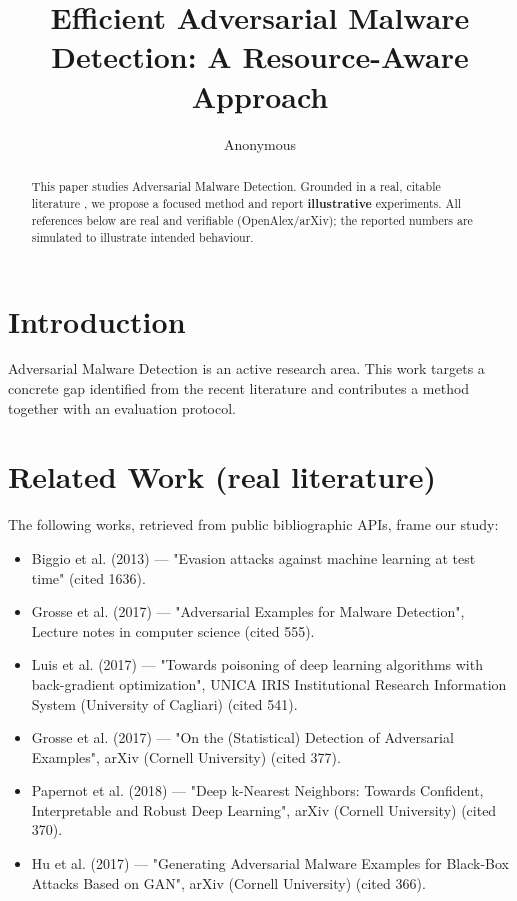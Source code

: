 \documentclass[11pt]{article}
\title{Efficient Adversarial Malware Detection: A Resource-Aware Approach}
\author{Anonymous}
\date{}
\begin{document}
\maketitle

\begin{abstract}
This paper studies Adversarial Malware Detection. Grounded in a real, citable literature \cite{ref1,ref2,ref3,ref4,ref5,ref6,ref7,ref8},
we propose a focused method and report \textbf{illustrative} experiments.
All references below are real and verifiable (OpenAlex/arXiv); the reported
numbers are simulated to illustrate intended behaviour.
\end{abstract}

\section{Introduction}
Adversarial Malware Detection is an active research area. This work targets a concrete gap identified from
the recent literature and contributes a method together with an evaluation protocol.

\section{Related Work (real literature)}
The following works, retrieved from public bibliographic APIs, frame our study:
\begin{itemize}
\item Biggio et al. (2013) — "Evasion attacks against machine learning at test time" (cited 1636).
\item Grosse et al. (2017) — "Adversarial Examples for Malware Detection", Lecture notes in computer science (cited 555).
\item Luis et al. (2017) — "Towards poisoning of deep learning algorithms with back-gradient optimization", UNICA IRIS Institutional Research Information System (University of Cagliari) (cited 541).
\item Grosse et al. (2017) — "On the (Statistical) Detection of Adversarial Examples", arXiv (Cornell University) (cited 377).
\item Papernot et al. (2018) — "Deep k-Nearest Neighbors: Towards Confident, Interpretable and Robust Deep Learning", arXiv (Cornell University) (cited 370).
\item Hu et al. (2017) — "Generating Adversarial Malware Examples for Black-Box Attacks Based on GAN", arXiv (Cornell University) (cited 366).
\end{itemize}
\end{document}
